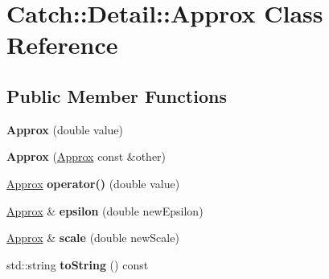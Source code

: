 \hypertarget{class_catch_1_1_detail_1_1_approx}{\section{Catch\-:\-:Detail\-:\-:Approx Class Reference}
\label{class_catch_1_1_detail_1_1_approx}
}
\subsection*{Public Member Functions}
\begin{DoxyCompactItemize}
\item 
\hypertarget{class_catch_1_1_detail_1_1_approx_a1a8618ea8db08c66bd3d9fe8f74b957a}{{\bfseries Approx} (double value)}\label{class_catch_1_1_detail_1_1_approx_a1a8618ea8db08c66bd3d9fe8f74b957a}

\item 
\hypertarget{class_catch_1_1_detail_1_1_approx_a807330c63266fc914abdf6e461255a54}{{\bfseries Approx} (\hyperlink{class_catch_1_1_detail_1_1_approx}{Approx} const \&other)}\label{class_catch_1_1_detail_1_1_approx_a807330c63266fc914abdf6e461255a54}

\item 
\hypertarget{class_catch_1_1_detail_1_1_approx_a48c9cbc28a05dc9dc8c3973b9eae2268}{\hyperlink{class_catch_1_1_detail_1_1_approx}{Approx} {\bfseries operator()} (double value)}\label{class_catch_1_1_detail_1_1_approx_a48c9cbc28a05dc9dc8c3973b9eae2268}

\item 
\hypertarget{class_catch_1_1_detail_1_1_approx_a05c50c3ad0a971fab19345b5d94979a9}{\hyperlink{class_catch_1_1_detail_1_1_approx}{Approx} \& {\bfseries epsilon} (double new\-Epsilon)}\label{class_catch_1_1_detail_1_1_approx_a05c50c3ad0a971fab19345b5d94979a9}

\item 
\hypertarget{class_catch_1_1_detail_1_1_approx_acd80f0737bf38112beacd5ca95bef113}{\hyperlink{class_catch_1_1_detail_1_1_approx}{Approx} \& {\bfseries scale} (double new\-Scale)}\label{class_catch_1_1_detail_1_1_approx_acd80f0737bf38112beacd5ca95bef113}

\item 
\hypertarget{class_catch_1_1_detail_1_1_approx_adeb74b73506b3f6b2ba72aea15168fbe}{std\-::string {\bfseries to\-String} () const }\label{class_catch_1_1_detail_1_1_approx_adeb74b73506b3f6b2ba72aea15168fbe}

\end{DoxyCompactItemize}
